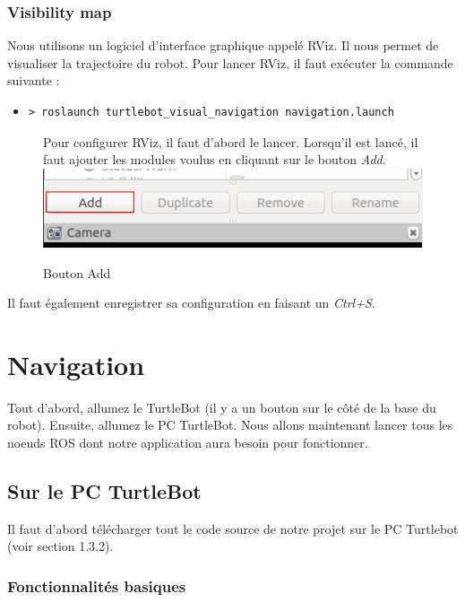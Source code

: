 \documentclass[10pt,a4paper]{article}
\begin{document}
\subsubsection{Visibility map}
\label{sec:visibilityMap}

Nous utilisons un logiciel d'interface graphique appelé RViz. Il nous permet de visualiser la trajectoire du robot. Pour lancer RViz, il faut exécuter la commande suivante :
\begin{itemize}
\item[] \begin{verbatim}> roslaunch turtlebot_visual_navigation navigation.launch \end{verbatim}
\end{itemize}
\begin{figure}
Pour configurer RViz, il faut d'abord le lancer. Lorsqu'il est lancé, il faut ajouter les modules voulus en cliquant sur le bouton \upshape \emph{Add}. \\

 \center
 \includegraphics[scale=0.5]{Add.png}
 \caption{Bouton Add}
\end{figure}
Il faut également enregistrer sa configuration en faisant un \upshape \emph{Ctrl+S}.


\newpage
\section{Navigation}
\label{sec:Navigation}

Tout d'abord, allumez le TurtleBot (il y a un bouton sur le côté de la base du robot). Ensuite, allumez le PC TurtleBot. Nous allons maintenant lancer tous les noeuds ROS dont notre application aura besoin pour fonctionner.

\subsection{Sur le PC TurtleBot}

Il faut d'abord télécharger tout le code source de notre projet sur le PC Turtlebot (voir section 1.3.2).

\subsubsection{Fonctionnalités basiques}
\label{sec:navigation2}
\end{document}
